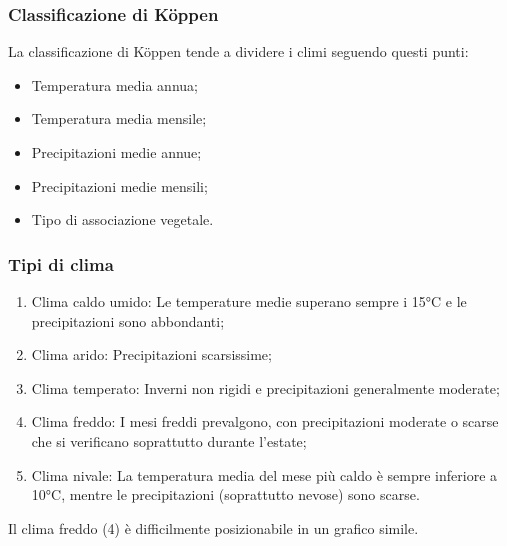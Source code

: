 \documentclass{article}
\begin{document}
\subsubsection{Classificazione di Köppen}
La classificazione di Köppen tende a dividere i climi seguendo questi punti:
\begin{itemize}
    \item Temperatura media annua;
    \item Temperatura media mensile;
    \item Precipitazioni medie annue;
    \item Precipitazioni medie mensili;
    \item Tipo di associazione vegetale.
\end{itemize}

\subsubsection{Tipi di clima}
\begin{enumerate}
    \item Clima caldo umido: Le temperature medie superano sempre i 15°C e le precipitazioni
        sono abbondanti;
    \item Clima arido: Precipitazioni scarsissime;
    \item Clima temperato: Inverni non rigidi e precipitazioni generalmente moderate;
    \item Clima freddo: I mesi freddi prevalgono, con precipitazioni moderate o scarse che si
        verificano soprattutto durante l'estate;
    \item Clima nivale: La temperatura media del mese più caldo è sempre inferiore a 10°C,
        mentre le precipitazioni (soprattutto nevose) sono scarse.
\end{enumerate}
\begin{center}
\end{center}
Il clima freddo (4) è difficilmente posizionabile in un grafico simile.
\end{document}
